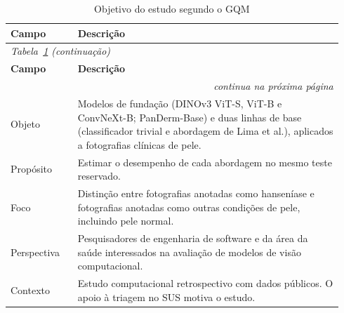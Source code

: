 \begingroup
\begin{longtable}{|p{0.19\linewidth}|p{0.75\linewidth}|}
	\caption{Objetivo do estudo segundo o GQM}\label{tab:gqm-avaliacao-empirica}                                                                                                                              \\
	\hline
	\textbf{Campo} & \textbf{Descrição}                                                                                                                                                                       \\ \hline
	\endfirsthead
	\multicolumn{2}{l}{\footnotesize\textit{Tabela~\ref{tab:gqm-avaliacao-empirica} (continuação)}}                                                                                                           \\
	\hline
	\textbf{Campo} & \textbf{Descrição}                                                                                                                                                                       \\ \hline
	\endhead
	\multicolumn{2}{r}{\footnotesize\textit{continua na próxima página}}                                                                                                                                      \\
	\endfoot
	\endlastfoot
	Objeto         & Modelos de fundação (DINOv3 ViT-S, ViT-B e ConvNeXt-B; PanDerm-Base) e duas linhas de base (classificador trivial e abordagem de Lima et al.), aplicados a fotografias clínicas de pele. \\ \hline
	Propósito      & Estimar o desempenho de cada abordagem no mesmo teste reservado.                                                                                                                         \\ \hline
	Foco           & Distinção entre fotografias anotadas como hanseníase e fotografias anotadas como outras condições de pele, incluindo pele normal.                                                        \\ \hline
	Perspectiva    & Pesquisadores de engenharia de software e da área da saúde interessados na avaliação de modelos de visão computacional.                                                                  \\ \hline
	Contexto       & Estudo computacional retrospectivo com dados públicos. O apoio à triagem no SUS motiva o estudo.                                                                                         \\ \hline
\end{longtable}
\endgroup
{}

